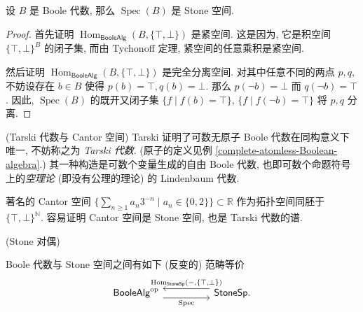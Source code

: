 \begin{prop}
	{}
	设 $B$ 是 Boole 代数, 那么 $\operatorname{Spec}(B)$ 是 Stone 空间.
\end{prop}

\begin{proof}
	首先证明 $\operatorname{Hom}_{\mathsf {BooleAlg}}(B,\{\top,\bot\})$ 是紧空间. 这是因为, 它是积空间 $\{\top,\bot\}^{B}$ 的闭子集, 而由 Tychonoff 定理, 紧空间的任意乘积是紧空间.%
	
	然后证明 $\operatorname{Hom}_{\mathsf {BooleAlg}}(B,\{\top,\bot\})$ 是完全分离空间. 对其中任意不同的两点 $p,q$,
	不妨设存在 $b\in B$ 使得 $p(b)=\top,q(b)=\bot$.
	那么 $p(\neg b)=\bot$ 而 $q(\neg b)=\top$.
	因此, $\operatorname{Spec}(B)$ 的既开又闭子集
	$\{f\mid f(b)=\top\}$, $\{f\mid f(\neg b)=\top\}$ 将 $p,q$ 分离.
\end{proof}

\begin{example}
	{(Tarski 代数与 Cantor 空间)}
	Tarski 证明了可数无原子 Boole 代数在同构意义下唯一, 不妨称之为 \emph{Tarski 代数}. (原子的定义见例 \ref{complete-atomless-Boolean-algebra}.) 其一种构造是可数个变量生成的自由 Boole 代数, 也即可数个命题符号上的\emph{空理论} (即没有公理的理论) 的 Lindenbaum 代数.
	
	著名的 Cantor 空间 $\big\{\sum_{n\geq 1}a_n3^{-n}\mid a_n\in\{0,2\}\big\}\subset \mathbb{R}$ 作为拓扑空间同胚于 $\{\top,\bot\}^{\mathbb{N}}$. 容易证明 Cantor 空间是 Stone 空间, 也是 Tarski 代数的谱.
\end{example}

\begin{prop}
	[label={Stone-duality}]
	{(Stone 对偶)}
	
	Boole 代数与 Stone 空间之间有如下 (反变的) 范畴等价
	\[\begin{tikzcd}[ampersand replacement=\&]
		{\mathsf {BooleAlg}^{\op}} \&\& {\mathsf {StoneSp}.}
		\arrow["{\operatorname{Spec}}"', shift right=2, from=1-1, to=1-3]
		\arrow["{\operatorname{Hom}_{\mathsf {StoneSp}}(-,\{\top,\bot\})}"', shift right=2, from=1-3, to=1-1]
	\end{tikzcd}\]
\end{prop}

